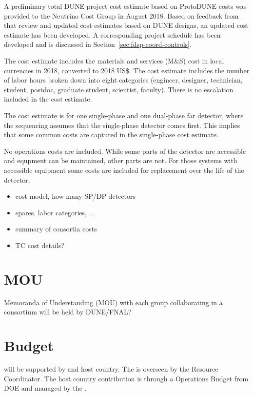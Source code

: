 A preliminary total DUNE project cost estimate based on ProtoDUNE
costs was provided to the Neutrino Cost Group in August 2018. Based on
feedback from that review and updated cost estimates based on DUNE
designs, an updated cost estimate has been developed. A corresponding
project schedule has been developed and is discussed in
Section~\ref{sec:fdsp-coord-controls}.

The cost estimate includes the materials and services (M\&S) cost in
local currencies in 2018, converted to 2018 US\$. The cost estimate
includes the number of labor hours broken down into eight categories
(engineer, designer, technician, student, postdoc, graduate student,
scientist, faculty). There is no escalation included in the cost estimate.

The cost estimate is for one single-phase and one dual-phase far
detector, where the sequencing assumes that the single-phase detector
comes first. This implies that some common costs are captured in the
single-phase cost estimate.

No operations costs are included. While some parts of the detector are
accessible and equpment can be maintained, other parts are not. For
those systems with accessible equipment some costs are included for
replacement over the life of the detector.

\begin{itemize}
 \item cost model, how many SP/DP detectors
 \item spares, labor categories, ...
 \item summary of consortia costs
 \item TC cost details?
\end{itemize}

\section{MOU}
\label{sec:fdsp-coord-mou}

Memoranda of Understanding (MOU) with each group collaborating in a
consortium will be held by DUNE/FNAL?

\section{Budget}
\label{sec:fdsp-coord-budget}

  will be supported by  and host
country. The  is overseen by the Resource Coordinator. The
host country contribution is through a 
Operations Budget from DOE and managed by the .

